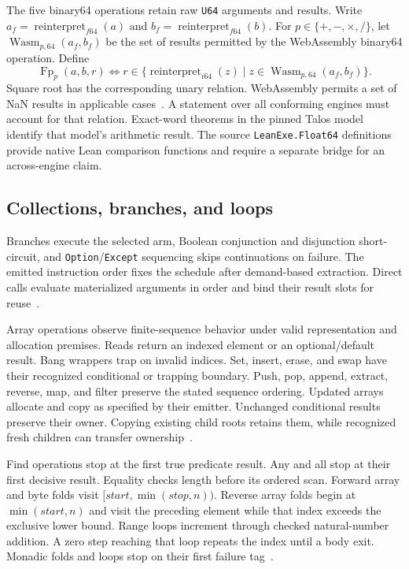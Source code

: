 \documentclass[11pt]{article}
\newcommand{\code}[1]{\texttt{#1}}
\begin{document}
The five binary64 operations retain raw \code{U64} arguments and results.  Write $a_f=\operatorname{reinterpret}_{f64}(a)$ and $b_f=\operatorname{reinterpret}_{f64}(b)$.  For $p\in\{+,-,\times,/\}$, let $\operatorname{Wasm}_{p,64}(a_f,b_f)$ be the set of results permitted by the WebAssembly binary64 operation.  Define
\[
\operatorname{Fp}_p(a,b,r)
\iff
r\in\{\operatorname{reinterpret}_{i64}(z)\mid
 z\in\operatorname{Wasm}_{p,64}(a_f,b_f)\}.
\]
Square root has the corresponding unary relation.  WebAssembly permits a set of NaN results in applicable cases~\cite{wasm}.  A statement over all conforming engines must account for that relation.  Exact-word theorems in the pinned Talos model identify that model's arithmetic result.  The source \code{LeanExe.Float64} definitions provide native Lean comparison functions and require a separate bridge for an across-engine claim.

\subsection{Collections, branches, and loops}

Branches execute the selected arm, Boolean conjunction and disjunction short-circuit, and \code{Option}/\code{Except} sequencing skips continuations on failure.  The emitted instruction order fixes the schedule after demand-based extraction.  Direct calls evaluate materialized arguments in order and bind their result slots for reuse~\cite{extract,binary}.

Array operations observe finite-sequence behavior under valid representation and allocation premises.  Reads return an indexed element or an optional/default result.  Bang wrappers trap on invalid indices.  Set, insert, erase, and swap have their recognized conditional or trapping boundary.  Push, pop, append, extract, reverse, map, and filter preserve the stated sequence ordering.  Updated arrays allocate and copy as specified by their emitter.  Unchanged conditional results preserve their owner.  Copying existing child roots retains them, while recognized fresh children can transfer ownership~\cite{values,binary}.

Find operations stop at the first true predicate result.  Any and all stop at their first decisive result.  Equality checks length before its ordered scan.  Forward array and byte folds visit $[\mathit{start},\min(\mathit{stop},n))$.  Reverse array folds begin at $\min(\mathit{start},n)$ and visit the preceding element while that index exceeds the exclusive lower bound.  Range loops increment through checked natural-number addition.  A zero step reaching that loop repeats the index until a body exit.  Monadic folds and loops stop on their first failure tag~\cite{binary}.
\end{document}
